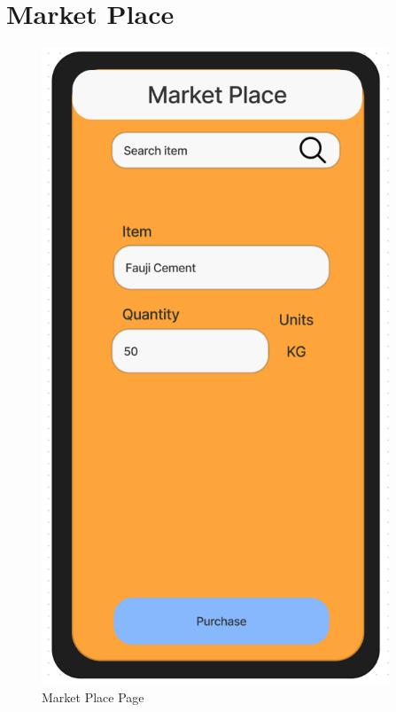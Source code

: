 \documentclass[title page]{article}
\begin{document}
\section{Market Place}
\begin{figure}[!h]
    \begin{center}
          \includegraphics[height=19cm]{images/marketplace.png}
          \caption{Market Place Page}
          \label{fig:marketplace}
    \end{center}
\end{figure}
\end{document}
